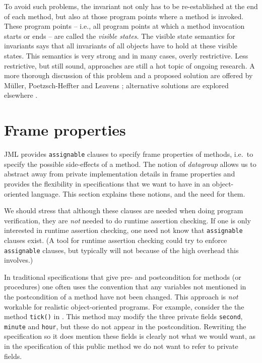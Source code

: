 \documentclass{llncs}
\begin{document}
To avoid such problems, the invariant not only has to be re-established at the
end of each method, but also at those program points where a method is invoked.
These program points -- i.e., all program points
at which a method invocation starts or ends -- are called the \emph{visible
states}. The visible state semantics for invariants says that all invariants
of all objects have to hold at these visible states.
%
This semantics is very strong and in many cases,
overly restrictive.  Less restrictive, but still sound, approaches are still a
hot topic of ongoing research. A more thorough discussion of this problem
and a proposed solution are offered by M\"{u}ller, Poetzsch-Heffter and
Leavens \cite{Mueller-Poetzsch-Heffter-Leavens05}; alternative solutions are
explored elsewhere
\cite{Huizing-Kuiper00,JacobsLeinoPiessensSchulte05,Middelkoop05}.

\section{Frame properties}
\label{Sec:assignable}


JML provides \texttt{assignable} clauses to specify frame properties
of methods, i.e.\ to specify the possible side-effects of a method.
The notion of \emph{datagroup} allows us to abstract away from private implementation 
details in frame properties and provides the flexibility in specifications
that we want to have in an object-oriented language.
This section explains these notions, and the need for them.

We should stress that although these clauses are needed when doing program 
verification, they are \emph{not} needed to do runtime assertion checking. 
If one is only interested in runtime assertion checking, one need not know 
that \texttt{assignable} clauses exist.
(A tool for runtime assertion checking could try to enforce \texttt{assignable} 
clauses, but typically will not because of the high overhead this involves.)

\smallskip

In traditional specifications that give pre- and postcondition for methods
(or procedures) one often uses the convention that any variables not mentioned 
in the postcondition of a method have not been changed.  This approach is 
\emph{not} workable for realistic object-oriented programs.
For example, consider the the method \texttt{tick()} in 
. This method may modify the three private 
fields \texttt{second}, \texttt{minute} and \texttt{hour}, but these do 
not appear in the postcondition. Rewriting the specification so it does 
mention these fields is clearly not what we would want, as in the 
specification of this public method we do not want to refer to private fields.
\end{document}
